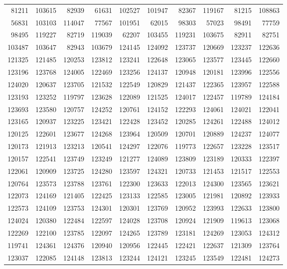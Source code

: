 \documentclass[11pt]{article}
\numberwithin{equation}{section}
\theoremstyle{definition}
\theoremstyle{remark}
\begin{document}
{\begin{longtable}{rrrrrrrrrr}
81211 & 103615 & 82939 & 61631 & 102527 & 101947 & 82367 & 119167 & 81215 & 108863\\
56831 & 103103 & 114047 & 77567 & 101951 & 62015 & 98303 & 57023 & 98491 & 77759\\
98495 & 119227 & 82719 & 119039 & 62207 & 103455 & 119231 & 103675 & 82911 & 82751\\
103487 & 103647 & 82943 & 103679 & 124145 & 124092 & 123737 & 120669 & 123237 & 122636\\
121325 & 121485 & 120253 & 123812 & 123241 & 122648 & 123065 & 123577 & 123445 & 122660\\
123196 & 123768 & 124005 & 122469 & 123256 & 124137 & 120948 & 120181 & 123996 & 122556\\
124020 & 120637 & 123705 & 121532 & 122549 & 120829 & 121437 & 122365 & 123957 & 122588\\
123193 & 123252 & 119797 & 123628 & 122089 & 121525 & 124017 & 122457 & 119789 & 124184\\
123693 & 123580 & 120757 & 124252 & 120761 & 124152 & 122293 & 124061 & 124021 & 122041\\
123165 & 120937 & 123225 & 123421 & 122428 & 123452 & 120285 & 124261 & 122488 & 124012\\
120125 & 122601 & 123677 & 124268 & 123964 & 120509 & 120701 & 120889 & 124237 & 124077\\
120173 & 121913 & 123213 & 120541 & 124297 & 122076 & 119773 & 122657 & 123228 & 123517\\
120157 & 122541 & 123749 & 123249 & 121277 & 124089 & 123809 & 123189 & 120333 & 122397\\
122061 & 120909 & 123725 & 124280 & 123597 & 124321 & 120733 & 121453 & 121517 & 122553\\
120764 & 123573 & 123788 & 123761 & 122300 & 123633 & 122013 & 124300 & 123565 & 123621\\
122073 & 124169 & 121405 & 122425 & 123133 & 122585 & 123005 & 121981 & 120892 & 123933\\
122573 & 124109 & 123753 & 124301 & 120301 & 123769 & 120952 & 123993 & 122633 & 123800\\
124024 & 120380 & 122484 & 122597 & 124028 & 123708 & 120924 & 121909 & 119613 & 123068\\
122269 & 122100 & 123785 & 122097 & 124265 & 123789 & 123181 & 124269 & 123053 & 124312\\
119741 & 124361 & 124376 & 120940 & 120956 & 122445 & 122421 & 122637 & 121309 & 123764\\
123037 & 122085 & 124148 & 123813 & 123244 & 124121 & 123245 & 123549 & 122481 & 124273\\

\end{longtable}}
\end{document}

